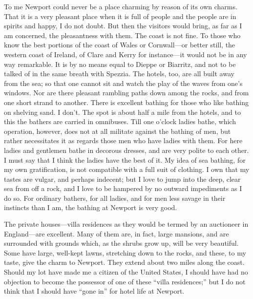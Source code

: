 To me Newport could never be a place charming by reason of its own
charms.  That it is a very pleasant place when it is full of people
and the people are in spirits and happy, I do not doubt.  But then
the visitors would bring, as far as I am concerned, the
pleasantness with them.  The coast is not fine.  To those who know
the best portions of the coast of Wales or Cornwall---or better
still, the western coast of Ireland, of Clare and Kerry for
instance---it would not be in any way remarkable.  It is by no means
equal to Dieppe or Biarritz, and not to be talked of in the same
breath with Spezzia.  The hotels, too, are all built away from the
sea; so that one cannot sit and watch the play of the waves from
one's windows.  Nor are there pleasant rambling paths down among
the rocks, and from one short strand to another.  There is
excellent bathing for those who like bathing on shelving sand.  I
don't.  The spot is about half a mile from the hotels, and to this
the bathers are carried in omnibuses.  Till one o'clock ladies
bathe, which operation, however, does not at all militate against
the bathing of men, but rather necessitates it as regards those men
who have ladies with them.  For here ladies and gentlemen bathe in
decorous dresses, and are very polite to each other.  I must say
that I think the ladies have the best of it.  My idea of sea
bathing, for my own gratification, is not compatible with a full
suit of clothing.  I own that my tastes are vulgar, and perhaps
indecent; but I love to jump into the deep, clear sea from off a
rock, and I love to be hampered by no outward impediments as I do
so.  For ordinary bathers, for all ladies, and for men less savage
in their instincts than I am, the bathing at Newport is very good.

The private houses---villa residences as they would be termed by an
auctioneer in England---are excellent.  Many of them are, in fact,
large mansions, and are surrounded with grounds which, as the
shrubs grow up, will be very beautiful.  Some have large, well-kept
lawns, stretching down to the rocks, and these, to my taste, give
the charm to Newport.  They extend about two miles along the coast.
Should my lot have made me a citizen of the United States, I should
have had no objection to become the possessor of one of these
``villa residences;'' but I do not think that I should have ``gone in''
for hotel life at Newport.

